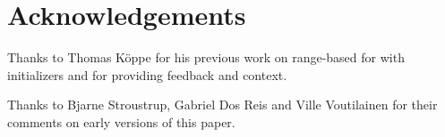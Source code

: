 \section*{Acknowledgements}

Thanks to Thomas Köppe for his previous work on range-based for with
initializers and for providing feedback and context.

Thanks to Bjarne Stroustrup, Gabriel Dos Reis and Ville Voutilainen for their
comments on early versions of this paper.
